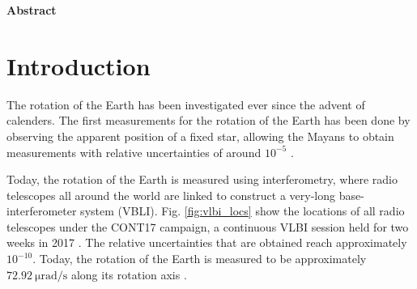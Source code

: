 \documentclass[a4paper]{report}
\numberwithin{equation}{section}
\begin{document}
\begin{titlepage}
	\vspace*{5em}

	\begin{minipage}{0.8\textwidth}
		\begin{centering}
			\textbf{Abstract}\\[0.2cm]
			 
		\end{centering}
	\end{minipage}
	
	
	
	
	
	
	 
	
	
\end{titlepage}



\tableofcontents

\chapter{Introduction}

The rotation of the Earth has been investigated ever since the advent of calenders. 
The first measurements for the rotation of the Earth has been done by observing the apparent
position of a fixed star, allowing the Mayans to obtain measurements with relative uncertainties of around $10^{-5}$ \cite{Groh2021}.

Today, the rotation of the Earth is measured using interferometry, where radio telescopes
all around the world are linked to construct a very-long base-interferometer system (VBLI). Fig. \ref{fig:vlbi_locs}
show the locations of all radio telescopes under the CONT17 campaign, a continuous VLBI session held for two weeks
in 2017 \cite{Behrend2020}. The relative
uncertainties that are obtained reach approximately $10^{-10}$. Today, the rotation of the Earth is 
measured to be approximately $\SI{72.92}{\micro\radian\per\second}$ along its rotation axis \cite{Groh2021}. \par 
\end{document}
